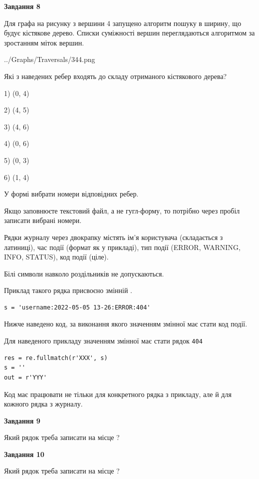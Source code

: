 \documentclass[12pt, ukrainian]{article}
\def\code#1{\Verb!#1!}
\begin{document}
{\begin {large}
{\begin {center}\textbf{Завдання 8}\end {center}}\par
Для графа на рисунку з вершини 4 запущено алгоритм пошуку в ширину, що будує кістякове дерево. Списки суміжності вершин переглядаються алгоритмом за зростанням міток вершин.\par
\begin{center}
	{../Graphs/Traversals/344.png}
\end{center}
\par Які з наведених ребер входять до складу отриманого кістякового дерева?\par
1) (0, 4)\par
2) (4, 5)\par
3) (4, 6)\par
4) (0, 6)\par
5) (0, 3)\par
6) (1, 4)\par
{\vskip 15pt} У формі вибрати номери відповідних ребер.


Якщо заповнюєте текстовий файл, а не гугл-форму, то потрібно через пробіл записа\-ти вибрані номери.\par
\newpage


Рядки журналу через двокрапку містять ім'я користувача (складається з латиниці), час події (фор\-мат як у прикладі), тип події (ERROR, WARNING, INFO, STATUS), код події (ціле).

Білі символи навколо роздільників не допускаються.

Приклад такого рядка присвоєно змінній .



\begin{verbatim}
s = 'username:2022-05-05 13-26:ERROR:404'
\end{verbatim}


Нижче наведено код, за виконання якого значенням змінної  має стати код події.

Для наведеного прикладу значенням змінної  має стати рядок \code{404}



\begin{verbatim}
res = re.fullmatch(r'XXX', s)
s = ''
out = r'YYY'
\end{verbatim}


Код має працювати не тільки для конкретного рядка з прикладу, але й для кожного рядка з журналу.

{\begin {center}\textbf{Завдання 9}\end {center}}\par
Який рядок треба записати на місце  ?\par
\vspace{5mm}


{\begin {center}\textbf{Завдання 10}\end {center}}\par
Який рядок треба записати на місце  ?\par


\newpage


\end {large}}
\end{document}
